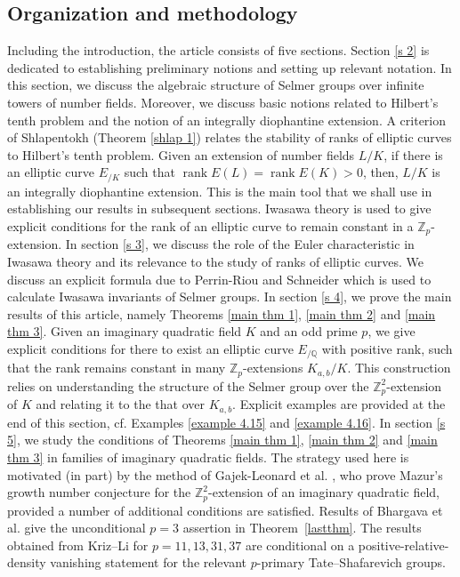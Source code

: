 \documentclass[12pt]{amsart}
\newcommand{\Z}{\mathbb{Z}}
\newcommand{\Q}{\mathbb{Q}}
\newcommand{\op}[1]{\operatorname{#1}}
\numberwithin{equation}{section}
\begin{document}
\subsection{Organization and methodology} Including the introduction, the article consists of five sections. Section \ref{s 2} is dedicated to establishing preliminary notions and setting up relevant notation. In this section, we discuss the algebraic structure of Selmer groups over infinite towers of number fields. Moreover, we discuss basic notions related to Hilbert's tenth problem and the notion of an integrally diophantine extension. A criterion of Shlapentokh (Theorem \ref{shlap 1}) relates the stability of ranks of elliptic curves to Hilbert's tenth problem. Given an extension of number fields $L/K$, if there is an elliptic curve $E_{/K}$ such that $\op{rank}E(L)=\op{rank}E(K)>0$, then, $L/K$ is an integrally diophantine extension. This is the main tool that we shall use in establishing our results in subsequent sections. Iwasawa theory is used to give explicit conditions for the rank of an elliptic curve to remain constant in a $\Z_p$-extension. In section \ref{s 3}, we discuss the role of the Euler characteristic in Iwasawa theory and its relevance to the study of ranks of elliptic curves. We discuss an explicit formula due to Perrin-Riou and Schneider which is used to calculate Iwasawa invariants of Selmer groups. In section \ref{s 4}, we prove the main results of this article, namely Theorems \ref{main thm 1}, \ref{main thm 2} and \ref{main thm 3}. Given an imaginary quadratic field $K$ and an odd prime $p$, we give explicit conditions for there to exist an elliptic curve $E_{/\Q}$ with positive rank, such that the rank remains constant in many $\Z_p$-extensions $K_{a,b}/K$. This construction relies on understanding the structure of the Selmer group over the $\Z_p^2$-extension of $K$ and relating it to the that over $K_{a,b}$. Explicit examples are provided at the end of this section, cf. Examples \ref{example 4.15} and \ref{example 4.16}. In section \ref{s 5}, we study the conditions of Theorems \ref{main thm 1}, \ref{main thm 2} and \ref{main thm 3} in families of imaginary quadratic fields. The strategy used here is motivated (in part) by the method of Gajek-Leonard et al. \cite{gajek2024conjecture}, who prove Mazur's growth number conjecture for the $\Z_p^2$-extension of an imaginary quadratic field, provided a number of additional conditions are satisfied. Results of Bhargava et al. \cite{BKOS} give the unconditional $p=3$ assertion in Theorem~\ref{lastthm}. The results obtained from Kriz--Li \cite{kriz-li} for $p=11,13,31,37$ are conditional on a positive-relative-density vanishing statement for the relevant $p$-primary Tate--Shafarevich groups.
\end{document}
